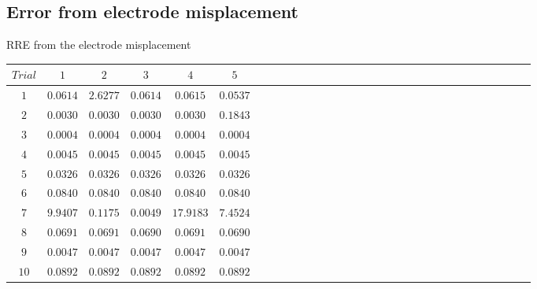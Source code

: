 \documentclass[t,12pt,english
\ifx\beamermode\undefined\else,\beamermode\fi
]{beamer}
\begin{document}
\subsection{Error from electrode misplacement}
\begin{frame}{RRE from the electrode misplacement}

\begin{table}[!htbp]
\tiny 
\centering
\begin{tabular}{c c c c c c c c c c c c c c c c c c c c c c c c c c c c c c c } 
   \hline 
$Trial$&$1$&$2$&$3$&$4$&$5$\\
   \hline 
$1$&$ 0.0614$&$ 2.6277$&$ 0.0614$&$ 0.0615$&$ 0.0537$\\
$2$&$ 0.0030$&$ 0.0030$&$ 0.0030$&$ 0.0030$&$ 0.1843$\\
$3$&$ 0.0004$&$ 0.0004$&$ 0.0004$&$ 0.0004$&$ 0.0004$\\
$4$&$ 0.0045$&$ 0.0045$&$ 0.0045$&$ 0.0045$&$ 0.0045$\\
$5$&$ 0.0326$&$ 0.0326$&$ 0.0326$&$ 0.0326$&$ 0.0326$\\
$6$&$ 0.0840$&$ 0.0840$&$ 0.0840$&$ 0.0840$&$ 0.0840$\\
$7$&$ 9.9407$&$ 0.1175$&$ 0.0049$&$17.9183$&$ 7.4524$\\
$8$&$ 0.0691$&$ 0.0691$&$ 0.0690$&$ 0.0691$&$ 0.0690$\\
$9$&$ 0.0047$&$ 0.0047$&$ 0.0047$&$ 0.0047$&$ 0.0047$\\
$10$&$ 0.0892$&$ 0.0892$&$ 0.0892$&$ 0.0892$&$ 0.0892$\\
\hline 

\end{tabular}
\end{table}

    
\end{frame}
\end{document}

